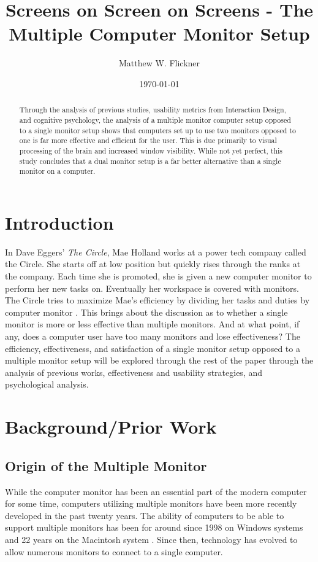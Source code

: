\documentclass[a4paper]{article}
\title{Screens on Screen on Screens - The Multiple Computer Monitor Setup}
\author{Matthew W. Flickner}
\date{\today}
\begin{document}
\maketitle

\begin{abstract}
Through the analysis of previous studies, usability metrics from Interaction Design, and cognitive psychology, the analysis of a multiple monitor computer setup opposed to a single monitor setup shows that computers set up to use two monitors opposed to one is far more effective and efficient for the user. This is due primarily to visual processing of the brain and increased window visibility. While not yet perfect, this study concludes that a dual monitor setup is a far better alternative than a single monitor on a computer.
\end{abstract}

\section{Introduction}
In Dave Eggers' \emph{The Circle}\/, Mae Holland works at a power tech company called the Circle. She starts off at low position but quickly rises through the ranks at the company. Each time she is promoted, she is given a new computer monitor to perform her new tasks on. Eventually her workspace is covered with monitors. The Circle tries to maximize Mae's efficiency by dividing her tasks and duties by computer monitor \cite{EggersCircle}. This brings about the discussion as to whether a single monitor is more or less effective than multiple monitors. And at what point, if any, does a computer user have too many monitors and lose effectiveness? The efficiency, effectiveness, and satisfaction of a single monitor setup opposed to a multiple monitor setup will be explored through the rest of the paper through the analysis of previous works, effectiveness and usability strategies, and psychological analysis.

\section{Background/Prior Work}
\subsection{Origin of the Multiple Monitor}
While the computer monitor has been an essential part of the modern computer for some time, computers utilizing multiple monitors have been more recently developed in the past twenty years. The ability of computers to be able to support multiple monitors has been for around since 1998 on Windows systems and 22 years on the Macintosh system \cite{Grudin}. Since then, technology has evolved to allow numerous monitors to connect to a single computer.
\end{document}
